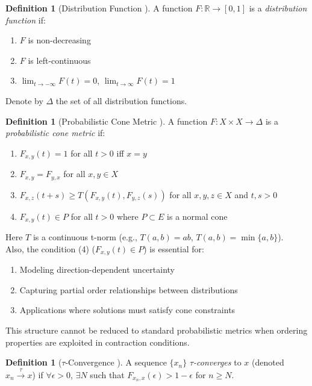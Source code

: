 \documentclass{amsart}
\theoremstyle{definition}
\newtheorem{definition}[theorem]{Definition}
\theoremstyle{remark}
\numberwithin{equation}{section}
\begin{document}
\begin{definition}[Distribution Function \cite{Schweizer1983}]
A function $F: \mathbb{R} \to [0,1]$ is a \textit{distribution function} if:

\begin{enumerate}
    \item $F$ is non-decreasing
    \item $F$ is left-continuous
    \item $\lim_{t \to -\infty} F(t) = 0$, $\lim_{t \to \infty} F(t) = 1$
\end{enumerate}

Denote by $\Delta$ the set of all distribution functions.


\end{definition}

\begin{definition}[Probabilistic Cone Metric \cite{Altun2010}]
A function $F: X \times X \to \Delta$ is a \textit{probabilistic cone metric} if:
\begin{enumerate}
    \item $F_{x,y}(t) = 1$ for all $t > 0$ iff $x = y$
    \item $F_{x,y} = F_{y,x}$ for all $x,y \in X$
    \item $F_{x,z}(t + s) \geq T(F_{x,y}(t), F_{y,z}(s))$ for all $x,y,z \in X$ and $t,s > 0$
    \item $F_{x,y}(t) \in P$ for all $t > 0$ where $P \subset E$ is a normal cone
\end{enumerate}
Here $T$ is a continuous t-norm (e.g., $T(a,b) = ab$, $T(a,b) = \min\{a,b\}$).\\
Also, the condition (4) ($F_{x,y}(t) \in P$) is essential for:
\begin{enumerate}
    \item Modeling direction-dependent uncertainty
    \item Capturing partial order relationships between distributions
    \item Applications where solutions must satisfy cone constraints
\end{enumerate}
This structure cannot be reduced to standard probabilistic metrics when ordering properties are exploited in contraction conditions.
\end{definition}

\begin{definition}[$\tau$-Convergence \cite{Schweizer1983}]
A sequence $\{x_n\}$ \textit{$\tau$-converges} to $x$ (denoted $x_n \xrightarrow{\tau} x$) if $\forall \epsilon > 0$, $\exists N$ such that $F_{x_n,x}(\epsilon) > 1 - \epsilon$ for $n \geq N$.
\end{definition}
\end{document}
